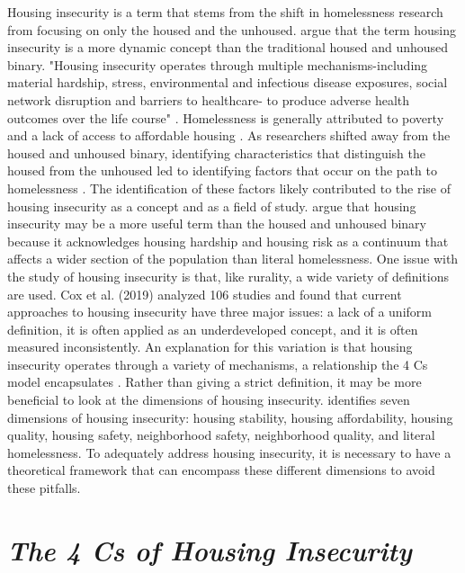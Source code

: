 Housing insecurity is a term that stems from the shift in homelessness research from focusing on only the housed and the unhoused. \citet{deluca_housing_2022} argue that the term housing insecurity is a more dynamic concept than the traditional housed and unhoused binary. "Housing insecurity operates through multiple mechanisms-including material hardship, stress, environmental and infectious disease exposures, social network disruption and barriers to healthcare- to produce adverse health outcomes over the life course" \citep[759]{leifheit_building_2022}. Homelessness is generally attributed to poverty and a lack of access to affordable housing \citep{national_coalition_for_the_homeless_rural_2009}. As researchers shifted away from the housed and unhoused binary, identifying characteristics that distinguish the housed from the unhoused led to identifying factors that occur on the path to homelessness \citep{phelan_social_2010}. The identification of these factors likely contributed to the rise of housing insecurity as a concept and as a field of study. \citet{deluca_housing_2022} argue that housing insecurity may be a more useful term than the housed and unhoused binary because it acknowledges housing hardship and housing risk as a continuum that affects a wider section of the population than literal homelessness. One issue with the study of housing insecurity is that, like rurality, a wide variety of definitions are used. Cox et al. (2019) analyzed 106 studies and found that current approaches to housing insecurity have three major issues: a lack of a uniform definition, it is often applied as an underdeveloped concept, and it is often measured inconsistently. An explanation for this variation is that housing insecurity operates through a variety of mechanisms, a relationship the 4 Cs model encapsulates \citep{leifheit_building_2022}. Rather than giving a strict definition, it may be more beneficial to look at the dimensions of housing insecurity. \citet{cox_road_2019} identifies seven dimensions of housing insecurity: housing stability, housing affordability, housing quality, housing safety, neighborhood safety, neighborhood quality, and literal homelessness. To adequately address housing insecurity, it is necessary to have a theoretical framework that can encompass these different dimensions to avoid these pitfalls.  

 

\section{\textit{The 4 Cs of Housing Insecurity}} 

